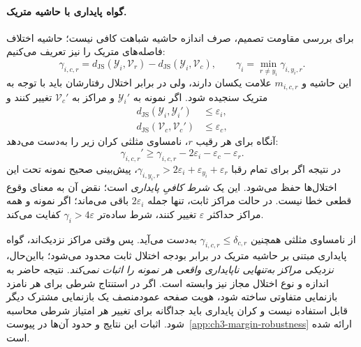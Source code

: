 \paragraph{گواه پایداری با حاشیه متریک.}
برای بررسی مقاومت تصمیم، صرف اندازه
حاشیه شباهت کافی نیست؛ حاشیه اختلاف
فاصله‌های متریک را نیز تعریف می‌کنیم:
\begin{equation}\label{eq:ch3-metric-robust-margin}
\boxed{
\gamma_{i,c,r}
=d_{\mathrm{JS}}(\mathscr Y_i,\mathcal V_r)
-d_{\mathrm{JS}}(\mathscr Y_i,\mathcal V_c),
\qquad
\gamma_i=\min_{r\ne y_i}\gamma_{i,y_i,r}.
}
\end{equation}
این حاشیه و $m_{i,c,r}$ علامت
یکسان دارند، ولی در برابر اختلال
رفتارشان باید با توجه به متریک سنجیده شود.
اگر نمونه به $\mathscr Y_i'$ و مراکز
به $\mathcal V_c'$ تغییر کنند و
\[
\begin{aligned}
d_{\mathrm{JS}}(\mathscr Y_i,\mathscr Y_i')&\le\varepsilon_i,\\
d_{\mathrm{JS}}(\mathcal V_c,\mathcal V_c')&\le\varepsilon_c,
\end{aligned}
\]
آنگاه برای هر رقیب $r$، نامساوی مثلثی
کران زیر را به‌دست می‌دهد:
\begin{equation}\label{eq:ch3-margin-perturbation-bound}
\boxed{
\gamma_{i,c,r}'
\ge \gamma_{i,c,r}
-2\varepsilon_i-\varepsilon_c-\varepsilon_r.
}
\end{equation}
در نتیجه اگر برای تمام رقبا
$\gamma_{i,y_i,r}>
2\varepsilon_i+\varepsilon_{y_i}+\varepsilon_r$،
پیش‌بینی صحیح نمونه تحت این
اختلال‌ها حفظ می‌شود.
این یک \emph{شرط کافیِ پایداری} است؛
نقض آن به معنای وقوع قطعی خطا نیست.
در حالت مراکز ثابت، تنها جمله
$2\varepsilon_i$ باقی می‌ماند؛
اگر نمونه و همه مراکز حداکثر
$\varepsilon$ تغییر کنند،
شرط ساده‌تر $\gamma_i>4\varepsilon$
کفایت می‌کند.

از نامساوی مثلثی همچنین
$\gamma_{i,c,r}\le\delta_{c,r}$
به‌دست می‌آید. پس وقتی مراکز نزدیک‌اند،
گواه پایداری مبتنی بر حاشیه متریک
در برابر بودجه اختلال ثابت
محدود می‌شود؛ بااین‌حال،
\emph{نزدیکی مراکز به‌تنهایی ناپایداری
واقعی هر نمونه را اثبات نمی‌کند}.
نتیجه حاضر به اندازه و نوع
اختلال مجاز نیز وابسته است.
اگر در استنتاج شرطی برای
هر نامزد بازنمایی متفاوتی ساخته شود،
هویت صفحه عمودمنصف یک بازنمایی مشترک
دیگر قابل استفاده نیست و کران پایداری
باید جداگانه برای تغییر هر امتیاز
شرطی محاسبه شود.
اثبات این نتایج و حدود آن‌ها در
پیوست~\ref{app:ch3-margin-robustness}
ارائه شده است.



